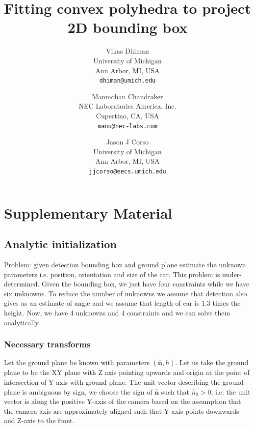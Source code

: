 \documentclass[10pt,twocolumn,letterpaper]{article}
\newcommand{\uv}[1]{\hat{\mathbf{#1}}}
\begin{document}
\title{Fitting convex polyhedra to project 2D bounding box}
\author{Vikas Dhiman\\
  University of Michigan\\
  Ann Arbor, MI, USA\\
{\tt\small dhiman@umich.edu}
\and
Manmohan Chandraker\\
NEC Laboratories America, Inc.\\
Cupertino, CA, USA\\
{\tt\small manu@nec-labs.com}
\and
Jason J Corso\\
  University of Michigan\\
  Ann Arbor, MI, USA\\
{\tt\small jjcorso@eecs.umich.edu}
}
\maketitle


\section{Supplementary Material}
\subsection{Analytic initialization}
Problem: given detection bounding box and ground plane estimate the unknown parameters i.e. position, orientation and size of the car. This problem is under-determined. Given the bounding box, we just have four constraints while we have six unknowns. To reduce the number of unknowns we assume that detection also gives us an estimate of angle and we assume that length of car is 1.3 times the height. Now, we have 4 unknowns and 4 constraints and we can solve them analytically.

\subsubsection{Necessary transforms}
Let the ground plane be known with parameters $(\uv{n}, h)$. Let us take the ground plane to be the XY plane with Z axis pointing upwards and origin at the point of intersection of Y-axis with ground plane. The unit vector describing the ground plane is ambiguous by sign, we choose the sign of $\uv{n}$ such that $\hat{n}_2 > 0$, i.e. the unit vector is along the positive Y-axis of the camera based on the assumption that the camera axis are approximately aligned such that Y-axis points downwards and Z-axis to the front.
\end{document}
